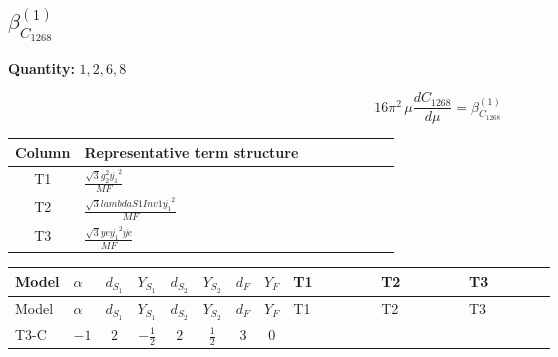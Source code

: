 \documentclass[8pt]{article}
\begin{document}
\begin{landscape}
\section*{$\beta_{C_{1268}}^{(1)}$}
\noindent\textbf{Quantity: }$\mathrm{1,2,6,8}$\par\smallskip
\[16\pi^2\,\mu\frac{d C_{1268}}{d\mu}=\beta_{C_{1268}}^{(1)}\]
\begin{center}
\begin{tabular}{@{}c >{\raggedright\arraybackslash}p{0.82\linewidth}@{}}
\toprule
Column & Representative term structure \\
\midrule
T1 & \(\displaystyle \frac{\sqrt{3} g_{2}^{2} \overline{y_{1}}^{2}}{MF}\) \\
\midrule
T2 & \(\displaystyle \frac{\sqrt{3} lambdaS1Inv1 \overline{y_{1}}^{2}}{MF}\) \\
\midrule
T3 & \(\displaystyle \frac{\sqrt{3} ye \overline{y_{1}}^{2} \overline{ye}}{MF}\) \\
\midrule
\bottomrule
\end{tabular}
\end{center}
\smallskip
\tiny
\begin{longtable}{@{}llcccccc >{\raggedright\arraybackslash}p{0.21\linewidth} >{\raggedright\arraybackslash}p{0.21\linewidth} >{\raggedright\arraybackslash}p{0.21\linewidth}@{}}
\toprule
Model & $\alpha$ & $d_{S_1}$ & $Y_{S_1}$ & $d_{S_2}$ & $Y_{S_2}$ & $d_F$ & $Y_F$ & T1 & T2 & T3 \\
\midrule
\endfirsthead
\toprule
Model & $\alpha$ & $d_{S_1}$ & $Y_{S_1}$ & $d_{S_2}$ & $Y_{S_2}$ & $d_F$ & $Y_F$ & T1 & T2 & T3 \\
\midrule
\endhead
T3-C & $-1$ & $2$ & $-\frac{1}{2}$ & $2$ & $\frac{1}{2}$ & $3$ & $0$ & \scriptsize\adjustbox{max width=\linewidth}{$\begin{gathered} \frac{\sqrt{3} g_{2}^{2} \overline{y_{1}}^{2}}{8 MF}\end{gathered}$} & \scriptsize\adjustbox{max width=\linewidth}{$\begin{gathered} \frac{\sqrt{3} lambdaS1Inv1 \overline{y_{1}}^{2}}{12 MF}\end{gathered}$} & \scriptsize\adjustbox{max width=\linewidth}{$\begin{gathered} - \frac{\sqrt{3} ye \overline{y_{1}}^{2} \overline{ye}}{24 MF}\end{gathered}$} \\
\midrule
\bottomrule
\end{longtable}
\clearpage

\end{landscape}
\end{document}
